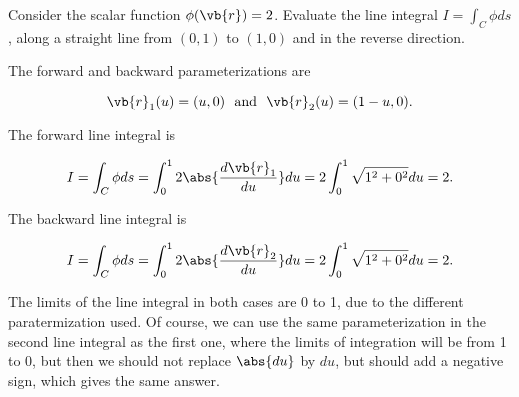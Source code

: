 \documentclass[english,a4paper,12pt]{report}
\begin{document}
{Consider the scalar function \(\phi (\vb{r} ) = 2\). Evaluate the line integral \(I = \int_{C}^{} \phi ds \), along a straight line from \((0,1)\) to \((1,0)\) and in the reverse direction.}
{The forward and backward parameterizations are

\begin{equation}
	\vb{r}_{1}  (u) = (u,0) ~\text { and }~ \vb{r}_{2} (u) = (1-u,0).
\end{equation}

The forward line integral is 

\begin{equation}
	I = \int_{C}^{} \phi ds = \int_{0}^{1} 2 \abs{\frac{d\vb{r} _{1} }{du} } du = 2 \int_{0}^{1} \sqrt{1^2 + 0^2} du = 2.     
\end{equation}

The backward line integral is 

\begin{equation}
	I = \int_{C}^{} \phi ds = \int_{0}^{1} 2 \abs{\frac{d\vb{r} _{2} }{du} } du = 2 \int_{0}^{1} \sqrt{1^2 + 0^2} du = 2.     
\end{equation}

The limits of the line integral in both cases are 0 to 1, due to the different paratermization used. Of course, we can use the same parameterization in the second line integral as the first one, where the limits of integration will be from 1 to 0, but then we should not replace \(\abs{du} \) by \(du\), but should add a negative sign, which gives the same answer.  
} 
\end{document}
